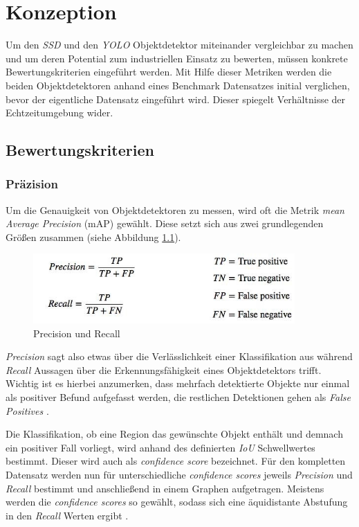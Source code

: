 \chapter{Konzeption}

Um den \textit{SSD} und den \textit{YOLO} Objektdetektor miteinander vergleichbar zu machen und um deren Potential zum industriellen Einsatz zu bewerten, müssen konkrete Bewertungskriterien eingeführt werden. Mit Hilfe dieser Metriken werden die beiden Objektdetektoren anhand eines Benchmark Datensatzes initial verglichen, bevor der eigentliche Datensatz eingeführt wird. Dieser spiegelt Verhältnisse der Echtzeitumgebung wider. 

\section{Bewertungskriterien}

\subsection*{Präzision}

Um die Genauigkeit von Objektdetektoren zu messen, wird oft die Metrik \textit{mean Average Precision} (mAP) gewählt. Diese setzt sich aus zwei grundlegenden Größen zusammen (siehe Abbildung \ref{metrics}). 

\begin{figure}[ht]
	\begin{center}
		\includegraphics[width=10cm]{Bilder/metrics.png} 
		\caption[Precision und Recall Metrik]{Precision und Recall \cite{JonathanHui.20180307}}
		\label{metrics}
	\end{center}
\end{figure}

\textit{Precision} sagt also etwas über die Verlässlichkeit einer Klassifikation aus während \textit{Recall} Aussagen über die Erkennungsfähigkeit eines Objektdetektors trifft. Wichtig ist es hierbei anzumerken, dass mehrfach detektierte Objekte nur einmal als positiver Befund aufgefasst werden, die restlichen Detektionen gehen als \textit{False Positives} \cite{TarangShah.20180127}.

Die Klassifikation, ob eine Region das gewünschte Objekt enthält und demnach ein positiver Fall vorliegt, wird anhand des definierten \textit{IoU} Schwellwertes bestimmt. Dieser wird auch als \textit{confidence score} bezeichnet. Für den kompletten Datensatz werden nun für unterschiedliche \textit{confidence scores} jeweils \textit{Precision} und \textit{Recall} bestimmt und anschließend in einem Graphen aufgetragen. Meistens werden die \textit{confidence scores} so gewählt, sodass sich eine äquidistante Abstufung in den \textit{Recall} Werten ergibt \cite{TarangShah.20180127}. 

